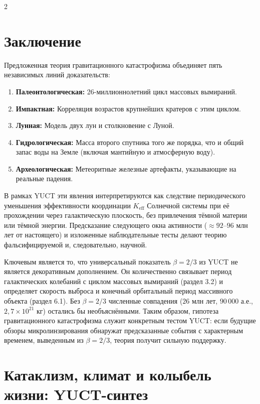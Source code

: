 \documentclass[11pt,a4paper]{article}
\begin{document}
	\begin{multicols}{2}
		
		\section{Заключение}
		
		Предложенная теория гравитационного катастрофизма объединяет пять независимых линий доказательств:
		\begin{enumerate}
			\item \textbf{Палеонтологическая:} 26-миллионнолетний цикл массовых вымираний.
			\item \textbf{Импактная:} Корреляция возрастов крупнейших кратеров с этим циклом.
			\item \textbf{Лунная:} Модель двух лун и столкновение с Луной.
			\item \textbf{Гидрологическая:} Масса второго спутника того же порядка, что и общий запас воды на Земле (включая мантийную и атмосферную воду).
			\item \textbf{Археологическая:} Метеоритные железные артефакты, указывающие на реальные падения.
		\end{enumerate}
		В рамках YUCT эти явления интерпретируются как следствие периодического уменьшения эффективности координации \(K_{\mathrm{eff}}\) Солнечной системы при её прохождении через галактическую плоскость, без привлечения тёмной материи или тёмной энергии. Предсказание следующего окна активности (\(\approx 92\)–\(96\) млн лет от настоящего) и изложенные наблюдательные тесты делают теорию фальсифицируемой и, следовательно, научной.
		
		Ключевым является то, что универсальный показатель $\beta = 2/3$ из YUCT не является декоративным дополнением. Он количественно связывает период галактических колебаний с циклом массовых вымираний (раздел 3.2) и определяет скорость выброса и конечный орбитальный период массивного объекта (раздел 6.1). Без $\beta = 2/3$ численные совпадения ($26$ млн лет, $90\,000$ а.е., $2,7\times10^{21}$ кг) остались бы необъяснёнными. Таким образом, гипотеза гравитационного катастрофизма служит конкретным тестом YUCT: если будущие обзоры микролинзирования обнаружат предсказанные события с характерным временем, выведенным из $\beta = 2/3$, теория получит сильную поддержку.
		
		\section{Катаклизм, климат и колыбель жизни: YUCT-синтез}
		

\end{multicols}
\end{document}
